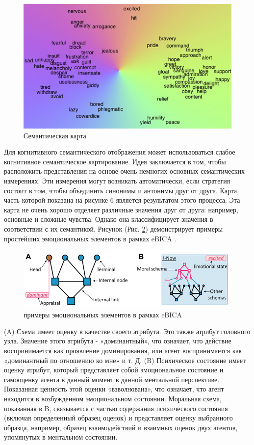 \begin{figure}[h]
\includegraphics[width=0.75\columnwidth]{./img/ris5.png}
\centering
\caption{Семантическая карта}
\label{pic:ris5}
\end{figure}

Для когнитивного семантического отображения может использоваться слабое когнитивное семантическое картирование. 
Идея заключается в том, чтобы расположить представления на основе очень немногих основных семантических измерениях. 
Эти измерения могут возникать автоматически, если стратегия состоит в том, чтобы объединить синонимы и антонимы друг от друга. 
Карта, часть которой показана на рисунке 6 является результатом этого процесса. Эта карта не очень хорошо отделяет различные 
значения друг от друга: например, основные и сложные чувства. Однако она классифицирует значения в соответствии с их семантикой. 
Рисунок (Рис. \ref{pic:ris6}) демонстрирует примеры простейших эмоциональных элементов в рамках eBICA \cite{Samsonovich01}.

\begin{figure}[h]
\includegraphics[width=0.75\columnwidth]{./img/ris6.png}
\centering
\caption{примеры эмоциональных элементов в рамках eBICA}
\label{pic:ris6}
\end{figure}

(A) Схема имеет оценку в качестве своего атрибута. Это также атрибут головного узла. Значение этого атрибута - «доминантный», 
что означает, что действие воспринимается как проявление доминирования, или агент воспринимается как «доминантный по отношению ко мне» 
и т. Д. (B) Психическое состояние имеет оценку атрибут, который представляет собой эмоциональное состояние и самооценку агента в данный 
момент в данной ментальной перспективе. Показанная ценность этой оценки «взволнована», что означает, что агент находится в возбужденном 
эмоциональном состоянии. Моральная схема, показанная в B, связывается с частью содержания психического состояния (включая определенный 
образец оценок) и представляет оценку выбранного образца, например, образец взаимодействий и взаимных оценок двух агентов, упомянутых в 
ментальном состоянии.

